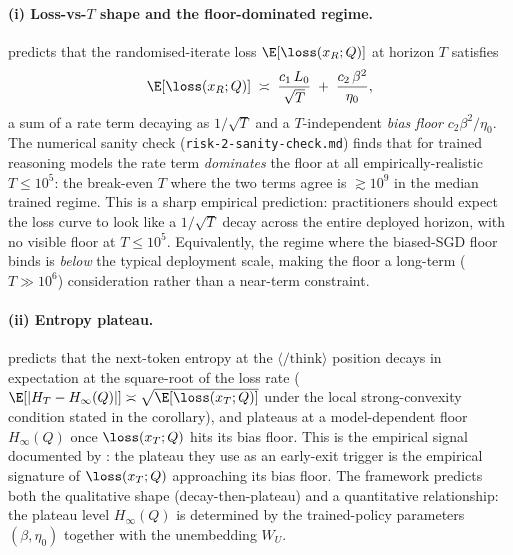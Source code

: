 \paragraph{(i) Loss-vs-$T$ shape and the floor-dominated regime.}
 predicts that the randomised-iterate
loss $\E[\loss(x_R; Q)]$ at horizon $T$ satisfies
\begin{align*}
   \E[\loss(x_R; Q)]
   \;\asymp\;
   \frac{c_1\, L_0}{\sqrt T}
   \;+\; \frac{c_2\, \beta^2}{\eta_0},
\end{align*}
a sum of a rate term decaying as $1/\sqrt T$ and a $T$-independent
\emph{bias floor} $c_2 \beta^2 / \eta_0$. The numerical sanity check
(\texttt{risk-2-sanity-check.md}) finds that for trained reasoning models
the rate term \emph{dominates} the floor at all empirically-realistic
$T \le 10^5$: the break-even $T$ where the two terms agree is
$\gtrsim 10^9$ in the median trained regime. This is a sharp empirical
prediction: practitioners should expect the loss curve to look like a
$1/\sqrt T$ decay across the entire deployed horizon, with no visible
floor at $T \le 10^5$. Equivalently, the regime where the
biased-SGD floor binds is \emph{below} the typical deployment scale,
making the floor a long-term ($T \gg 10^6$) consideration rather than a
near-term constraint.

\paragraph{(ii) Entropy plateau.}
 predicts that the next-token entropy at the
$\langle/\mathrm{think}\rangle$ position decays in expectation at the
square-root of the loss rate
($\E[|H_T - H_\infty(Q)|] \asymp \sqrt{\E[\loss(x_T; Q)]}$ under the
local strong-convexity condition stated in the corollary), and
plateaus at a model-dependent floor $H_\infty(Q)$ once $\loss(x_T; Q)$
hits its bias floor. This is the empirical signal documented by
\cite{choi2025entropy}: the plateau they use as an early-exit trigger is
the empirical signature of $\loss(x_T; Q)$ approaching its bias floor.
The framework predicts both the qualitative shape (decay-then-plateau)
and a quantitative relationship: the plateau level $H_\infty(Q)$ is
determined by the trained-policy parameters $(\beta, \eta_0)$ together
with the unembedding $W_U$.

